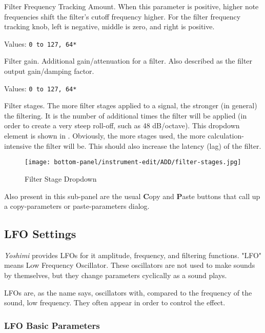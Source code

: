    Filter Frequency Tracking Amount.
   When this parameter is positive, higher note
   frequencies shift the filter’s cutoff frequency higher.
   For the filter frequency tracking knob, left is negative, middle is
   zero, and right is positive.

   Values: \texttt{0 to 127, 64*}

   Filter gain.
   Additional gain/attenuation for a filter.
   Also described as the filter output gain/damping factor.

   Values: \texttt{0 to 127, 64*}

   Filter stages.
   The more filter stages applied to a signal, the stronger (in general) the
   filtering.
   It is the number of additional times the filter will be applied (in
   order to create a very steep roll-off, such as 48 dB/octave).
   This dropdown
   element is shown in
   .
   Obviously, the more stages used, the more calculation-intensive the
   filter will be.  This should also increase the latency (lag) of the
   filter.

\begin{figure}[H]
   \centering 
   \texttt{[image: bottom-panel/instrument-edit/ADD/filter-stages.jpg]}
   \caption[Filter Stage Dropdown]{Filter Stage Dropdown}
   \label{fig:filter_stage_dropdown} 
\end{figure}

   Also present in this sub-panel are the usual \textbf{C}opy
   and \textbf{P}aste buttons that call up a copy-parameters or
   paste-parameters dialog.

\subsection{LFO Settings}
\label{subsec:lfo_settings}

   \textsl{Yoshimi} provides LFOs for it amplitude, frequency, and filtering
   functions.
   "LFO" means Low Frequency Oscillator. These oscillators are not used to make
   sounds by themselves, but they change parameters cyclically as a sound
   plays.

   LFOs are, as the name says, oscillators with, compared to the frequency of
   the sound, low frequency. They often appear in order to control the
   effect.

\subsubsection{LFO Basic Parameters}
\label{subsubsec:lfo_basic_parameters}

